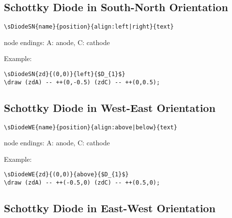\documentclass[parskip=full]{scrartcl}
\begin{document}
\subsection{Schottky Diode in South-North Orientation}

\begin{verbatim}
\sDiodeSN{name}{position}{align:left|right}{text}
\end{verbatim}
node endings: A: anode, C: cathode

Example:\\
\begin{minipage}{0.8\textwidth}
\begin{verbatim}
\sDiodeSN{zd}{(0,0)}{left}{$D_{1}$}
\draw (zdA) -- ++(0,-0.5) (zdC) -- ++(0,0.5);
\end{verbatim}
\end{minipage}
\begin{minipage}{0.19\textwidth}
\end{minipage}

\subsection{Schottky Diode in West-East Orientation}

\begin{verbatim}
\sDiodeWE{name}{position}{align:above|below}{text}
\end{verbatim}
node endings: A: anode, C: cathode

Example:\\
\begin{minipage}{0.8\textwidth}
\begin{verbatim}
\sDiodeWE{zd}{(0,0)}{above}{$D_{1}$}
\draw (zdA) -- ++(-0.5,0) (zdC) -- ++(0.5,0);
\end{verbatim}
\end{minipage}
\begin{minipage}{0.19\textwidth}
\end{minipage}

\subsection{Schottky Diode in East-West Orientation}
\end{document}
